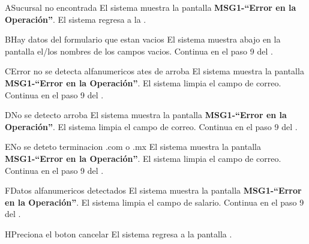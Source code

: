 
\begin{UCtrayectoriaA}{A}{Sucursal no encontrada}
	\UCpaso El sistema muestra la pantalla {\bf MSG1-``Error en la Operación''}.
	\UCpaso El sistema regresa a la .
\end{UCtrayectoriaA}

\begin{UCtrayectoriaA}{B}{Hay datos del formulario que estan vacios}
	\UCpaso El sistema muestra abajo en la pantalla el/los nombres de los campos vacios.
	\UCpaso Continua en el paso 9 del .
\end{UCtrayectoriaA}	

\begin{UCtrayectoriaA}{C}{Error no se detecta alfanumericos ates de arroba}
	\UCpaso  El sistema muestra la pantalla {\bf MSG1-``Error en la Operación''}.
	\UCpaso El sistema limpia el campo de correo.
	\UCpaso Continua en el paso 9 del .
\end{UCtrayectoriaA}

\begin{UCtrayectoriaA}{D}{No se detecto arroba}
	\UCpaso  El sistema muestra la pantalla {\bf MSG1-``Error en la Operación''}.
	\UCpaso El sistema limpia el campo de correo.
	\UCpaso Continua en el paso 9 del .
\end{UCtrayectoriaA}


\begin{UCtrayectoriaA}{E}{No se deteto terminacion .com o .mx}
	\UCpaso  El sistema muestra la pantalla {\bf MSG1-``Error en la Operación''}.
	\UCpaso El sistema limpia el campo de correo.
	\UCpaso Continua en el paso 9 del .
\end{UCtrayectoriaA}


\begin{UCtrayectoriaA}{F}{Datos alfanumericos detectados}
	\UCpaso  El sistema muestra la pantalla {\bf MSG1-``Error en la Operación''}.
	\UCpaso El sistema limpia el campo de salario.
	\UCpaso Continua en el paso 9 del .
\end{UCtrayectoriaA}

\begin{UCtrayectoriaA}{H}{Preciona el boton cancelar}
	\UCpaso El sistema regresa a la pantalla  .
\end{UCtrayectoriaA}